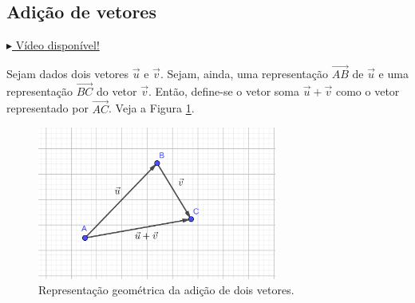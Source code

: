 \subsection{Adição de vetores}

\begin{flushright}
  \href{https://archive.org/details/adicao-de-vetores}{$\blacktriangleright$ Vídeo disponível!}
\end{flushright}

Sejam dados dois vetores $\vec{u}$ e $\vec{v}$. Sejam, ainda, uma representação $\overrightarrow{AB}$ de $\vec{u}$ e uma representação $\overrightarrow{BC}$ do vetor $\vec{v}$. Então, define-se o vetor soma $\vec{u}+\vec{v}$ como o vetor representado por $\overrightarrow{AC}$. Veja a Figura \ref{fig:vadicao}.

\begin{figure}[H]
  \centering
  \includegraphics[width=0.7\textwidth]{./cap_vetor/dados/fig_vadicao/fig_vadicao}
  \caption{Representação geométrica da adição de dois vetores.}
  \label{fig:vadicao}
\end{figure}

